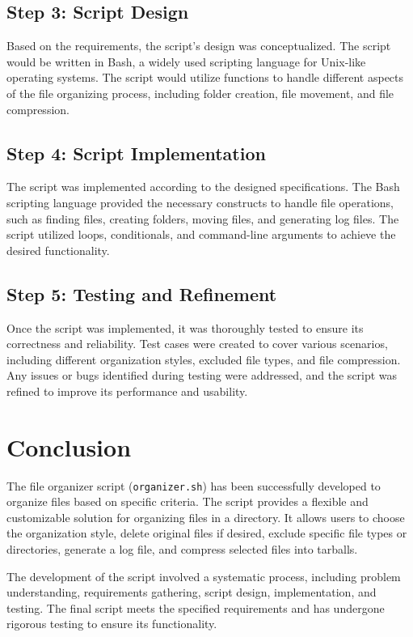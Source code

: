 \documentclass{article}
\begin{document}
\subsection{Step 3: Script Design}
Based on the requirements, the script's design was conceptualized. The script would be written in Bash, a widely used scripting language for Unix-like operating systems. The script would utilize functions to handle different aspects of the file organizing process, including folder creation, file movement, and file compression.

\subsection{Step 4: Script Implementation}
The script was implemented according to the designed specifications. The Bash scripting language provided the necessary constructs to handle file operations, such as finding files, creating folders, moving files, and generating log files. The script utilized loops, conditionals, and command-line arguments to achieve the desired functionality.

\subsection{Step 5: Testing and Refinement}
Once the script was implemented, it was thoroughly tested to ensure its correctness and reliability. Test cases were created to cover various scenarios, including different organization styles, excluded file types, and file compression. Any issues or bugs identified during testing were addressed, and the script was refined to improve its performance and usability.

\section{Conclusion}
The file organizer script (\texttt{organizer.sh}) has been successfully developed to organize files based on specific criteria. The script provides a flexible and customizable solution for organizing files in a directory. It allows users to choose the organization style, delete original files if desired, exclude specific file types or directories, generate a log file, and compress selected files into tarballs.

The development of the script involved a systematic process, including problem understanding, requirements gathering, script design, implementation, and testing. The final script meets the specified requirements and has undergone rigorous testing to ensure its functionality.
\end{document}
